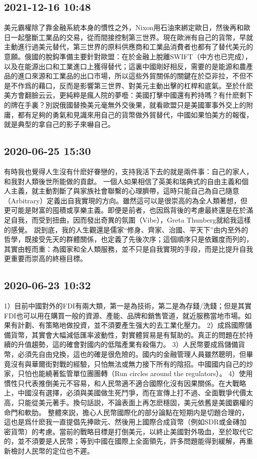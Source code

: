 \documentclass[twocolumn]{ctexart}
\begin{document}
\subsection*{2021-12-16 10:48}

美元霸權除了靠金融系統本身的慣性之外，Nixon用石油來綁定歐日，然後再和歐日一起壟斷工業品的交易，從而間接控制第三世界。現在歐洲有自己的貨幣，早就主動進行過美元替代，第三世界的原料供應商和工業品消費者也都有了替代美元的意願。俄國的脫鈎準備主要針對歐盟：在於金融上脫離SWIFT（中方也已完成），以及在能源出口和工業進口上獲得替代；這裏中國剛好相反，需要的是能源和農產品的進口來源和工業品的出口市場，所以這些外貿關係的關鍵在於亞非拉，不但不是不作爲的藉口，反而是影響第三世界、對美元主動出擊的杠桿和底氣。至於什麽美方會翻臉云云，更純粹是瘋人院的夢囈：美國打擊中國還有矜持嗎？有什麽剩下的牌在手裏？別説俄國替換美元毫無外交後果，就看歐盟只是美國軍事外交上的附庸，都有足夠的勇氣和見識來用自己的貨幣做外貿替代，中國如果怕美方的報復，就是典型的拿自己的影子來嚇自己。
\subsection*{2020-06-25 15:30}

有時我也覺得人生沒有什麽好眷戀的，支持我活下去的就是兩件事：自己的家人，和我對人類後世所能做的貢獻。
一個人如果相信了英美和瑞典式的自由主義和個人主義，就主動割斷了與家族社會聯繫的心理臍帶，這時只能自己為自己隨意（Arbitrary）定義出自我實現的方向。雖然這可以是很崇高的為全人類著想，但更可能是財富的囤積或享樂主義。即便是前者，也因爲背後的考慮最終還是在於滿足自我，而受到扭曲，因而發出奇異的氛圍（Vibe），Greta Thunberg就給我這樣的感覺。
説到底，我的人生觀還是儒家“修身、齊家、治國、平天下”由内至外的哲學，既接受先天的群體關係，也定義了先後次序；這個順序只是依難度而列的，其實由輕而重：為國家和全人類服務，並不只是自我實現的手段，而是比提升自我更重要而崇高的終極目標。
\subsection*{2020-06-23 10:32}

1）目前中國對外的FDI有兩大類，第一是為技術，第二是為存錢/洗錢；但是其實FDI也可以用在購買一般的資源、產能、品牌和銷售管道，就近服務當地市場。如果有計劃、有策略地做投資，並不須要產生强大的去工業化壓力。
2）成爲國際儲備貨幣，其實會大幅減低匯率波動性，對實體貿易是有幫助的。真正的問題在於持續的升值趨勢，這的確會對國内的低階產業有殺傷力。
3）人民幣要成爲儲備貨幣，必須先自由兌換，這也的確是很危險的。國内的金融管理人員雖然聰明，但畢竟沒有與華爾街對戰的經驗，只怕無法或無力接下所有的陰招。中國國内自己的炒家，只怕也能繞著監管單位團團轉（Run circles around the regulators）。
4）使用慣性只代表推倒美元不容易，和人民幣適不適合國際化沒有因果關係。在大戰略上，中國沒有選擇，必須與美國做生死鬥爭，而在宣傳上打不過、全面戰爭代價太高，只能從美元著手。換句話説，不論表面上再怎麽穩固，美元依舊是美國霸權的命門和軟肋。
整體來説，擔心人民幣國際化的部分論點在短期内是切題合理的，這也是爲什麽我一直提倡先捧歐元、然後用上國際合成貨幣（例如SDR或金磚加密貨幣）的考慮。當前的戰略目標是打倒美元，以終止美國對外吸血，至於取代它的，並不須要是人民幣；等到中國在國際上全面領先，許多問題能得到緩解，再重新檢討人民幣的定位也不遲。
\end{document}
